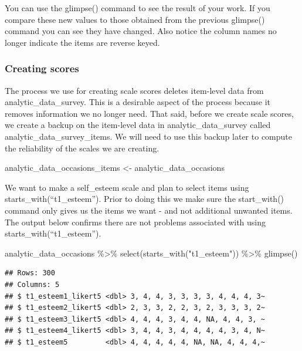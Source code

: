 \documentclass[
]{krantz}
\makeatletter
\newenvironment{Shaded}{\begin{snugshade}}{\end{snugshade}}
\newcommand{\FunctionTok}[1]{\textcolor[rgb]{0,0,0}{#1}}
\newcommand{\NormalTok}[1]{#1}
\newcommand{\OtherTok}[1]{\textcolor[rgb]{0.37,0.37,0.37}{#1}}
\newcommand{\SpecialCharTok}[1]{\textcolor[rgb]{0,0,0}{#1}}
\newcommand{\StringTok}[1]{\textcolor[rgb]{0.5,0.5,0.5}{#1}}
\newenvironment{kframe}{%
\medskip{}
\setlength{\fboxsep}{.8em}
 \def\at@end@of@kframe{}%
 \ifinner\ifhmode%
  \def\at@end@of@kframe{\end{minipage}}%
  \begin{minipage}{\columnwidth}%
 \fi\fi%
 \def\FrameCommand##1{\hskip\@totalleftmargin \hskip-\fboxsep
 \colorbox{shadecolor}{##1}\hskip-\fboxsep
     \hskip-\linewidth \hskip-\@totalleftmargin \hskip\columnwidth}%
 \MakeFramed {\advance\hsize-\width
   \@totalleftmargin\z@ \linewidth\hsize
   \@setminipage}}%
 {\par\unskip\endMakeFramed%
 \at@end@of@kframe}
\renewenvironment{Shaded}{\begin{kframe}}{\end{kframe}}
\makeatother
\begin{document}
You can use the glimpse() command to see the result of your work. If you compare these new values to those obtained from the previous glimpse() command you can see they have changed. Also notice the column names no longer indicate the items are reverse keyed.

\hypertarget{creating-scores-1}{%
\subsubsection{Creating scores}\label{creating-scores-1}}

The process we use for creating scale scores deletes item-level data from analytic\_data\_survey. This is a desirable aspect of the process because it removes information we no longer need. That said, before we create scale scores, we create a backup on the item-level data in analytic\_data\_survey called analytic\_data\_survey\_items. We will need to use this backup later to compute the reliability of the scales we are creating.

\begin{Shaded}
\begin{Highlighting}[]
\NormalTok{analytic\_data\_occasions\_items }\OtherTok{\textless{}{-}}\NormalTok{ analytic\_data\_occasions}
\end{Highlighting}
\end{Shaded}

We want to make a self\_esteem scale and plan to select items using starts\_with(``t1\_esteem''). Prior to doing this we make sure the start\_with() command only gives us the items we want - and not additional unwanted items. The output below confirms there are not problems associated with using starts\_with(``t1\_esteem'').

\begin{Shaded}
\begin{Highlighting}[]
\NormalTok{analytic\_data\_occasions }\SpecialCharTok{\%\textgreater{}\%}
  \FunctionTok{select}\NormalTok{(}\FunctionTok{starts\_with}\NormalTok{(}\StringTok{"t1\_esteem"}\NormalTok{)) }\SpecialCharTok{\%\textgreater{}\%}
  \FunctionTok{glimpse}\NormalTok{()}
\end{Highlighting}
\end{Shaded}

\begin{verbatim}
## Rows: 300
## Columns: 5
## $ t1_esteem1_likert5 <dbl> 3, 4, 4, 3, 3, 3, 3, 4, 4, 4, 3~
## $ t1_esteem2_likert5 <dbl> 2, 3, 3, 2, 2, 3, 2, 3, 3, 3, 2~
## $ t1_esteem3_likert5 <dbl> 4, 4, 4, 3, 4, 4, NA, 4, 4, 3, ~
## $ t1_esteem4_likert5 <dbl> 3, 4, 4, 3, 4, 4, 4, 4, 3, 4, N~
## $ t1_esteem5         <dbl> 4, 4, 4, 4, 4, NA, NA, 4, 4, 4,~
\end{verbatim}
\end{document}
